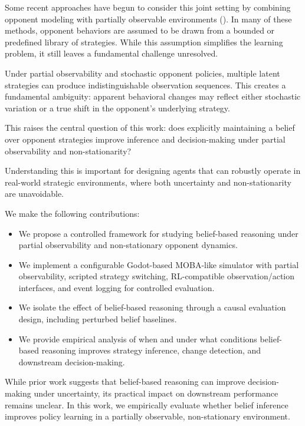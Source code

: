 \documentclass{article}
\begin{document}
Some recent approaches have begun to consider this joint setting by combining opponent modeling with partially observable environments (\cite{zheng2018deep, wang2022bayesian, davies2020opponent}). In many of these methods, opponent behaviors are assumed to be drawn from a bounded or predefined library of strategies. While this assumption simplifies the learning problem, it still leaves a fundamental challenge unresolved.

Under partial observability and stochastic opponent policies, multiple latent strategies can produce indistinguishable observation sequences. This creates a fundamental ambiguity: apparent behavioral changes may reflect either stochastic variation or a true shift in the opponent’s underlying strategy.

This raises the central question of this work: does explicitly maintaining a belief over opponent strategies improve inference and decision-making under partial observability and non-stationarity?

Understanding this is important for designing agents that can robustly operate in real-world strategic environments, where both uncertainty and non-stationarity are unavoidable.

We make the following contributions:
\begin{itemize}
    \item We propose a controlled framework for studying belief-based reasoning under partial observability and non-stationary opponent dynamics.
    \item We implement a configurable Godot-based MOBA-like simulator with partial observability, scripted strategy switching, RL-compatible observation/action interfaces, and event logging for controlled evaluation.
    \item We isolate the effect of belief-based reasoning through a causal evaluation design, including perturbed belief baselines.
    \item We provide empirical analysis of when and under what conditions belief-based reasoning improves strategy inference, change detection, and downstream decision-making.
\end{itemize}

While prior work suggests that belief-based reasoning can improve decision-making under uncertainty, its practical impact on downstream performance remains unclear. In this work, we empirically evaluate whether belief inference improves policy learning in a partially observable, non-stationary environment.
\end{document}
